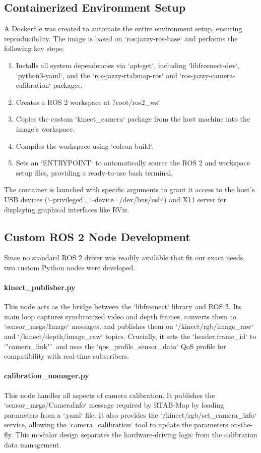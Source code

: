 \documentclass[a4paper,12pt]{article}
\begin{document}
\subsection{Containerized Environment Setup}
A Dockerfile was created to automate the entire environment setup, ensuring reproducibility. The image is based on `ros:jazzy-ros-base` and performs the following key steps:
\begin{enumerate}
    \item Installs all system dependencies via `apt-get`, including `libfreenect-dev`, `python3-yaml`, and the `ros-jazzy-rtabmap-ros` and `ros-jazzy-camera-calibration` packages.
    \item Creates a ROS 2 workspace at \`/root/ros2\_ws`.
    \item Copies the custom `kinect\_camera` package from the host machine into the image's workspace.
    \item Compiles the workspace using `colcon build`.
    \item Sets an `ENTRYPOINT` to automatically source the ROS 2 and workspace setup files, providing a ready-to-use bash terminal.
\end{enumerate}
The container is launched with specific arguments to grant it access to the host's USB devices (`--privileged`, `--device=/dev/bus/usb`) and X11 server for displaying graphical interfaces like RViz.

\subsection{Custom ROS 2 Node Development}
Since no standard ROS 2 driver was readily available that fit our exact needs, two custom Python nodes were developed.

\paragraph{kinect\_publisher.py} This node acts as the bridge between the `libfreenect` library and ROS 2. Its main loop captures synchronized video and depth frames, converts them to `sensor\_msgs/Image` messages, and publishes them on `/kinect/rgb/image\_raw` and `/kinect/depth/image\_raw` topics. Crucially, it sets the `header.frame\_id` to `"camera\_link"` and uses the `qos\_profile\_sensor\_data` QoS profile for compatibility with real-time subscribers.

\paragraph{calibration\_manager.py} This node handles all aspects of camera calibration. It publishes the `sensor\_msgs/CameraInfo` message required by RTAB-Map by loading parameters from a `.yaml` file. It also provides the `/kinect/rgb/set\_camera\_info` service, allowing the `camera\_calibration` tool to update the parameters on-the-fly. This modular design separates the hardware-driving logic from the calibration data management.
\end{document}
